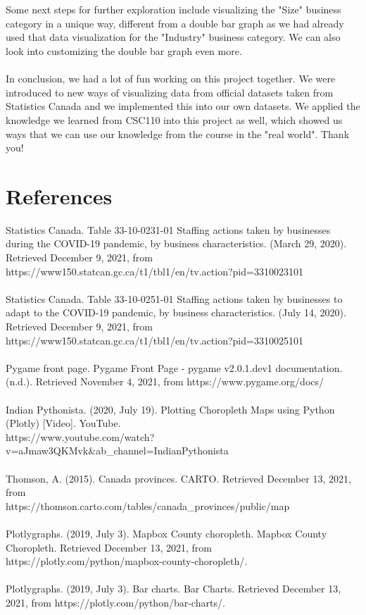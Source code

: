 \documentclass[fontsize=11pt]{article}
\begin{document}
    \\
    \\
    Some next steps for further exploration include visualizing the "Size" business category in a unique way, different from a double bar graph as we had already used that data visualization for the "Industry" business category. We can also look into customizing the double bar graph even more.
    \\
    \\
    In conclusion, we had a lot of fun working on this project together. We were introduced to new ways of visualizing data from official datasets taken from Statistics Canada and we implemented this into our own datasets. We applied the knowledge we learned from CSC110 into this project as well, which showed us ways that we can use our knowledge from the course in the "real world". Thank you!


    \section*{References}

    Statistics Canada. Table 33-10-0231-01  Staffing actions taken by businesses during the COVID-19 pandemic, by business characteristics.
    (March 29, 2020). Retrieved December 9, 2021, from
    \\
    https://www150.statcan.gc.ca/t1/tbl1/en/tv.action?pid=3310023101
    \\
    \\
    Statistics Canada. Table 33-10-0251-01  Staffing actions taken by businesses to adapt to the COVID-19 pandemic, by business characteristics.
    (July 14, 2020). Retrieved December 9, 2021, from
    \\
    https://www150.statcan.gc.ca/t1/tbl1/en/tv.action?pid=3310025101
    \\
    \\
    Pygame front page. Pygame Front Page - pygame v2.0.1.dev1 documentation. (n.d.). Retrieved November 4, 2021, from https://www.pygame.org/docs/
    \\
    \\
    Indian Pythonista. (2020, July 19). Plotting Choropleth Maps using Python (Plotly) [Video]. YouTube.
    \\
    https://www.youtube.com/watch?v=aJmaw3QKMvk&ab\_channel=IndianPythonista
    \\
    \\
    Thomson, A. (2015). Canada provinces. CARTO. Retrieved December 13, 2021, from
    \\https://thomson.carto.com/tables/canada\_provinces/public/map
    \\
    \\
    Plotlygraphs. (2019, July 3). Mapbox County choropleth. Mapbox County Choropleth. Retrieved December 13, 2021, from https://plotly.com/python/mapbox-county-choropleth/.
    \\
    \\
    Plotlygraphs. (2019, July 3). Bar charts. Bar Charts. Retrieved December 13, 2021, from https://plotly.com/python/bar-charts/.
\end{document}
